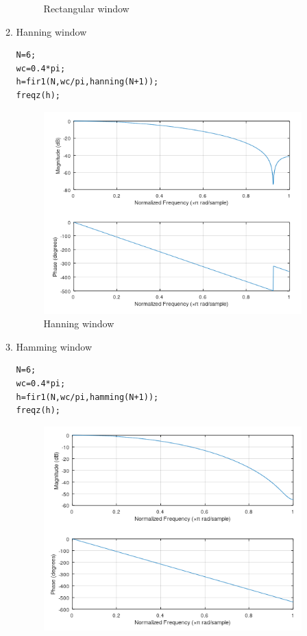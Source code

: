 \documentclass[12pt]{article}
\begin{document}
\begin{enumerate}
\begin{enumerate}
\begin{figure}[h!]
        \caption{Rectangular window}
    \end{figure}
    \item Hanning window
    \begin{Verbatim}[frame = single]
N=6;
wc=0.4*pi;
h=fir1(N,wc/pi,hanning(N+1));
freqz(h);
    \end{Verbatim}
    \begin{figure}[h!]
        \centering
        \includegraphics{labss/Lab6_5b.PNG}
        \caption{Hanning window}
    \end{figure}
    \pagebreak
    \item Hamming window
    \begin{Verbatim}[frame = single]
N=6;
wc=0.4*pi;
h=fir1(N,wc/pi,hamming(N+1));
freqz(h);
    \end{Verbatim}
    \begin{figure}[h!]
        \centering
        \includegraphics{labss/Lab6_5c.PNG}

\end{figure}
\end{enumerate}
\end{enumerate}
\end{document}
